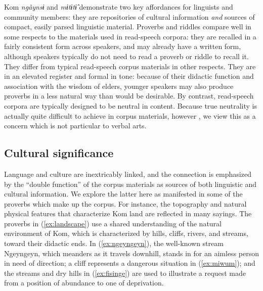 \documentclass[output=paper,colorlinks,citecolor=brown
]{langscibook}
\begin{document}
Kom \textit{ngàynsɨ} and \textit{mɨtɨtɨ̂} demonstrate two key affordances for linguists and community members: they are repositories of cultural information \textit{and} sources of compact, easily parsed linguistic material. 
Proverbs and riddles compare well in some respects to the materials used in read-speech corpora: they are recalled in a fairly consistent form across speakers, and may already have a written form, although speakers typically do not need to read a proverb or riddle to recall it. 
They differ from typical read-speech corpus materials in other respects. They are in an elevated register and formal in tone: because of their didactic function and association with the wisdom of elders, younger speakers may also produce proverbs in a less natural way than would be desirable. 
By contrast, read-speech corpora are typically designed to be neutral in content.
Because true neutrality is actually quite difficult to achieve in corpus materials, however \citep{tripp2021written}, we view this as a concern which is not particular to verbal arts. 

\subsection{Cultural significance} 

Language and culture are inextricably linked, and the connection is emphasized by the ``double function'' of the corpus materials as sources of both linguistic and cultural information. 
We explore the latter here as manifested in some of the proverbs which make up the corpus.
For instance, the topography and natural physical features that characterize Kom land are reflected in many sayings. The proverbs in (\ref{ex:landscape}) use a shared understanding of the natural environment of Kom, which is characterized by hills, cliffs, rivers, and streams, toward their didactic ends. In (\ref{ex:ngeyngeyn}), the well-known stream Ngeyngeyn, which meanders as it travels downhill, stands in for an aimless person in need of direction; a cliff represents a dangerous situation in (\ref{ex:miwum}); and the streams and dry hills in (\ref{ex:fisinge}) are used to illustrate a request made from a position of abundance to one of deprivation.
\end{document}
